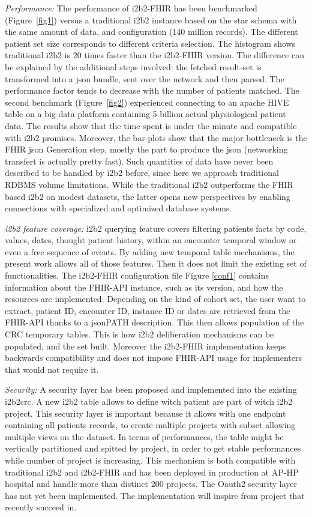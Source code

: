 \documentclass{amia}
\begin{document}
\textit{Performance:} The performance of i2b2-FHIR has been benchmarked (Figure~\ref{fig1}) versus a traditional i2b2 instance based on the star schema with the same amount of data, and configuration (140 million records). The different patient set size corresponds to different criteria selection. The histogram shows traditional i2b2 is 20 times faster than the i2b2-FHIR version. The difference can be explained by the additional steps involved: the fetched result-set is transformed into a json bundle, sent over the network and then parsed. The performance factor tends to decrease with the number of patients matched. The second benchmark (Figure~\ref{fig2}) experienced connecting to an apache HIVE table on a big-data platform containing 5 billion actual physiological patient data. The results show that the time spent is under the minute and compatible with i2b2 promises. Moreover, the bar-plots show that the major bottleneck is the FHIR json Generation step, mostly the part to produce the json (networking transfert is actually pretty fast). Such quantities of data have never been described to be handled by i2b2 before, since here we approach traditional RDBMS volume limitations. While the traditional i2b2 outperforms the FHIR based i2b2 on modest datasets, the latter opens new perspectives by enabling connections with specialized and optimized database systems.


\textit{i2b2 feature coverage: }i2b2 querying feature covers filtering patients facts by code, values, dates, thought patient history, within an encounter temporal window or even a free sequence of events. By adding new temporal table mechanisms, the present work allows all of those features. Then it does not limit the existing set of functionalities. The i2b2-FHIR configuration file Figure \ref{conf1} contains information about the FHIR-API instance, such as its version, and how the resources are implemented. Depending on the kind of cohort set, the user want to extract, patient ID, encounter ID, instance ID or dates are retrieved from the FHIR-API thanks to a jsonPATH description. This then allows population of the CRC temporary tables. This is how i2b2 deliberation mechanisms can be populated, and the set built. Moreover the i2b2-FHIR implementation keeps backwards compatibility and does not impose FHIR-API usage for implementers that would not require it.

\textit{Security:} A security layer has been proposed and implemented into the existing i2b2crc. A new i2b2 table allows to define witch patient are part of witch i2b2 project. This security layer is important because it allows with one endpoint containing all patients records, to create multiple projects with subset allowing multiple views on the dataset. In terms of performances, the table might be vertically partitioned and spitted by project, in order to get stable performances while number of project is increasing. This mechanism is both compatible with traditional i2b2 and i2b2-FHIR and has been deployed in production at AP-HP hospital and handle more than distinct 200 projects. The Oauth2 security layer has not yet been implemented. The implementation will inspire from project\cite{Wagholikar_2016,Pfiffner__2016} that recently succeed in.
\end{document}
